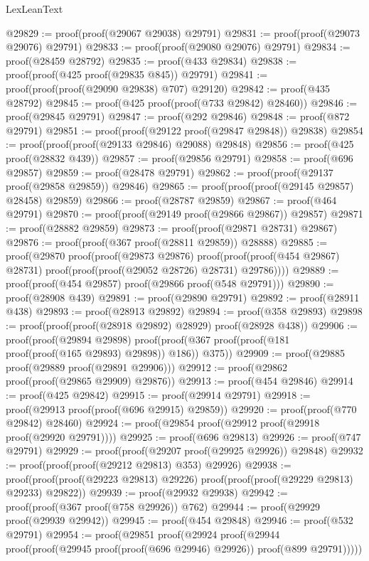 \begin{lexlean}{LexLeanText}
\begin{coremodule}
@29829 := proof(proof(@29067 @29038) @29791)
@29831 := proof(proof(@29073 @29076) @29791)
@29833 := proof(proof(@29080 @29076) @29791)
@29834 := proof(@28459 @28792)
@29835 := proof(@433 @29834)
@29838 := proof(proof(@425 proof(@29835 @845)) @29791)
@29841 := proof(proof(proof(@29090 @29838) @707) @29120)
@29842 := proof(@435 @28792)
@29845 := proof(@425 proof(proof(@733 @29842) @28460))
@29846 := proof(@29845 @29791)
@29847 := proof(@292 @29846)
@29848 := proof(@872 @29791)
@29851 := proof(proof(@29122 proof(@29847 @29848)) @29838)
@29854 := proof(proof(proof(@29133 @29846) @29088) @29848)
@29856 := proof(@425 proof(@28832 @439))
@29857 := proof(@29856 @29791)
@29858 := proof(@696 @29857)
@29859 := proof(@28478 @29791)
@29862 := proof(proof(@29137 proof(@29858 @29859)) @29846)
@29865 := proof(proof(proof(@29145 @29857) @28458) @29859)
@29866 := proof(@28787 @29859)
@29867 := proof(@464 @29791)
@29870 := proof(proof(@29149 proof(@29866 @29867)) @29857)
@29871 := proof(@28882 @29859)
@29873 := proof(proof(@29871 @28731) @29867)
@29876 := proof(proof(@367 proof(@28811 @29859)) @28888)
@29885 := proof(@29870
      proof(proof(@29873 @29876)
          proof(proof(proof(@454 @29867) @28731) proof(proof(proof(@29052 @28726) @28731) @29786))))
@29889 := proof(proof(@454 @29857) proof(@29866 proof(@548 @29791)))
@29890 := proof(@28908 @439)
@29891 := proof(@29890 @29791)
@29892 := proof(@28911 @438)
@29893 := proof(@28913 @29892)
@29894 := proof(@358 @29893)
@29898 := proof(proof(proof(@28918 @29892) @28929) proof(@28928 @438))
@29906 := proof(proof(@29894 @29898)
      proof(proof(@367 proof(proof(@181 proof(proof(@165 @29893) @29898)) @186)) @375))
@29909 := proof(@29885 proof(@29889 proof(@29891 @29906)))
@29912 := proof(@29862 proof(proof(@29865 @29909) @29876))
@29913 := proof(@454 @29846)
@29914 := proof(@425 @29842)
@29915 := proof(@29914 @29791)
@29918 := proof(@29913 proof(proof(@696 @29915) @29859))
@29920 := proof(proof(@770 @29842) @28460)
@29924 := proof(@29854 proof(@29912 proof(@29918 proof(@29920 @29791))))
@29925 := proof(@696 @29813)
@29926 := proof(@747 @29791)
@29929 := proof(proof(@29207 proof(@29925 @29926)) @29848)
@29932 := proof(proof(proof(@29212 @29813) @353) @29926)
@29938 := proof(proof(proof(@29223 @29813) @29226) proof(proof(proof(@29229 @29813) @29233) @29822))
@29939 := proof(@29932 @29938)
@29942 := proof(proof(@367 proof(@758 @29926)) @762)
@29944 := proof(@29929 proof(@29939 @29942))
@29945 := proof(@454 @29848)
@29946 := proof(@532 @29791)
@29954 := proof(@29851
      proof(@29924
          proof(@29944 proof(proof(@29945 proof(proof(@696 @29946) @29926)) proof(@899 @29791)))))

\end{coremodule}
\end{lexlean}
